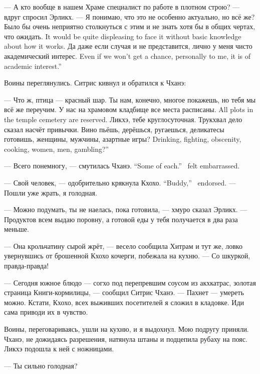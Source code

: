 --- А кто вообще в нашем Храме специалист по работе в плотном строю? --- вдруг спросил Эрликх.
--- Я понимаю, что это не особенно актуально, но всё же?
{Было бы очень неприятно столкнуться с этим и не знать хотя бы в общих чертах, что ожидать.}
{It would be quite displeasing to face it without basic knowledge about how it works.}
{Да даже если случая и не представится, лично у меня чисто академический интерес.}
{Even if we won't get a chance, personally to me, it is of academic interest.''}

Воины переглянулись.
Ситрис кивнул и обратился к Чханэ:

--- Что ж, птица --- красный шар\FM.
Ты нам, конечно, многое покажешь, но тебя мы всё же переучим.
{У нас на храмовом кладбище все места расписаны.}
{All plots in the temple cemetery are reserved.}
Ликхэ, тебе круглосуточная.
Трукхвал дело сказал насчёт привычки.
{Вино пьёшь, дерёшься, ругаешься, деликатесы готовишь, женщины, мужчины, азартные игры?}
{Drinking, fighting, obscenity, cooking, women, men, gambling?''}

{--- Всего понемногу, --- смутилась Чханэ.}
{``Some of each.'' \Chhanei\ felt embarrassed.}

{--- Свой человек, --- одобрительно крякнула Кхохо.}
{``Buddy,'' \Kchoho\ endorsed.}
--- Пошли уже жрать, я голодная.

--- Можно подумать, ты не наелась, пока готовила, --- хмуро сказал Эрликх.
--- Продуктов всем выдаю поровну, а готовой еды у тебя получается в два раза меньше.

--- Она крольчатину сырой жрёт, --- весело сообщила Хитрам и тут же, ловко увернувшись от брошенной Кхохо кочерги, побежала на кухню.
--- Со шкуркой, правда-правда!

--- Сегодня южное блюдо --- согхо под перепревшим соусом из акхкатрас, золотая страница Книги-кормилицы\FM, --- сообщил Ситрис Чханэ.
--- Пахнет --- умереть можно.
Кстати, Кхохо, всех выживших посетителей я сложил в кладовке.
Иди сама приводи их в чувство.

Воины, переговариваясь, ушли на кухню, и я выдохнул.
Мою подругу приняли.
Чханэ, не дожидаясь разрешения, натянула штаны и подцепила рубаху на пояс.
Ликхэ подошла к ней с ножницами.

--- Ты сильно голодная?

